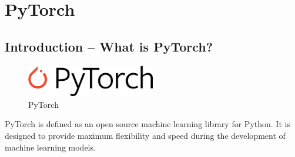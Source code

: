 \documentclass[12pt,hyperref,a4paper,UTF8]{article}
\begin{document}
\cover
\thispagestyle{empty}%
\newpage

\newpage
\tableofcontents

\newpage

\section{PyTorch}

\subsection{Introduction -- What is PyTorch?}
\begin{figure}[h]
    \centering
    \includegraphics[width=0.5\textwidth]{figures/PyTorch_logo_black.svg.png}
    \caption{PyTorch}
\end{figure}

\textbf{}PyTorch is defined as an open source machine learning library for Python. It is designed to provide maximum flexibility and speed during the development of machine learning models.
\end{document}
